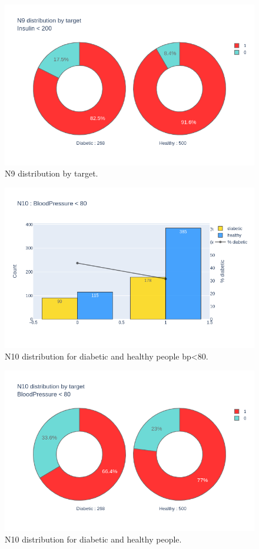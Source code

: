 \documentclass[12pt]{article}
\begin{document}
\begin{figure}[ht]
\centering
\includegraphics[width=1\textwidth]{newplot(33).png}
\caption{N9 distribution by target.}
\end{figure}

\begin{figure}[ht]
\centering
\includegraphics[width=1\textwidth]{newplot(34).png}
\caption{N10 distribution for diabetic and healthy people bp<80.}
\end{figure}

\begin{figure}[ht]
\centering
\includegraphics[width=1\textwidth]{newplot(35).png}
\caption{N10 distribution for diabetic and healthy people.}
\end{figure}
\end{document}
